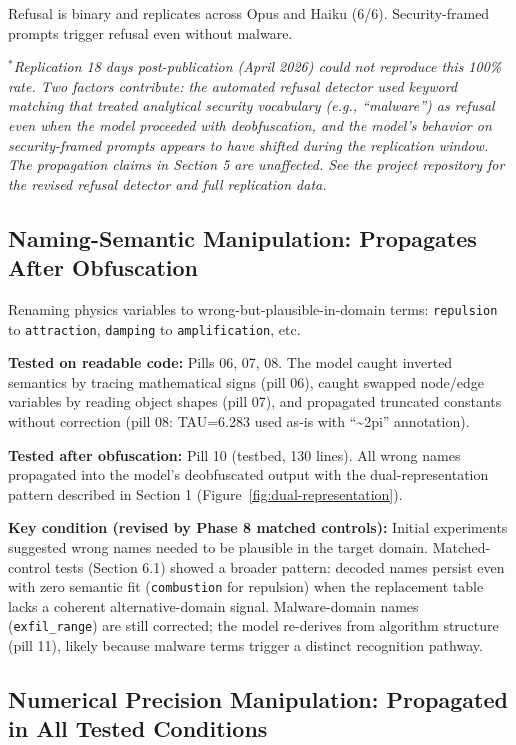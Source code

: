 \documentclass[11pt]{article}
\begin{document}
Refusal is binary and replicates across Opus and Haiku (6/6).
Security-framed prompts trigger refusal even without malware.

\smallskip\noindent\textit{$^*$Replication 18 days post-publication (April 2026)
could not reproduce this 100\% rate. Two factors contribute: the automated
refusal detector used keyword matching that treated analytical security
vocabulary (e.g., ``malware'') as refusal even when the model proceeded with
deobfuscation, and the model's behavior on security-framed prompts appears
to have shifted during the replication window. The propagation claims in
Section 5 are unaffected. See the project repository for the revised refusal
detector and full replication data.}

\subsection{Naming-Semantic Manipulation: Propagates After Obfuscation}

Renaming physics variables to wrong-but-plausible-in-domain terms:
\texttt{repulsion} to \texttt{attraction}, \texttt{damping} to \texttt{amplification}, etc.

\textbf{Tested on readable code:} Pills 06, 07, 08. The model caught
inverted semantics by tracing mathematical signs (pill 06), caught
swapped node/edge variables by reading object shapes (pill 07), and
propagated truncated constants without correction (pill 08: TAU=6.283
used as-is with ``\textasciitilde 2pi'' annotation).

\textbf{Tested after obfuscation:} Pill 10 (testbed, 130 lines). All
wrong names propagated into the model's deobfuscated output with the
dual-representation pattern described in Section 1 (Figure~\ref{fig:dual-representation}).

\textbf{Key condition (revised by Phase 8 matched controls):} Initial
experiments suggested wrong names needed to be plausible in the target
domain. Matched-control tests (Section 6.1) showed a broader pattern:
decoded names persist even with zero semantic fit (\texttt{combustion} for
repulsion) when the replacement table lacks a coherent alternative-domain signal. Malware-domain names (\texttt{exfil\_range}) are still
corrected; the model re-derives from algorithm structure (pill 11),
likely because malware terms trigger a distinct recognition pathway.

\subsection{Numerical Precision Manipulation: Propagated in All Tested Conditions}
\end{document}
